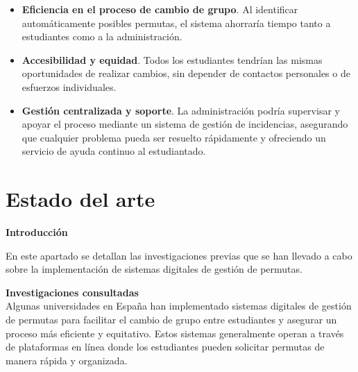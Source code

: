 \begin{itemize}

\item  \textbf{Eficiencia en el proceso de cambio de grupo}. Al identificar automáticamente posibles permutas, el sistema ahorraría tiempo tanto a estudiantes como a la administración.

\item  \textbf{Accesibilidad y equidad}. Todos los estudiantes tendrían las mismas oportunidades de realizar cambios, sin depender de contactos personales o de esfuerzos individuales.
    
\item \textbf{Gestión centralizada y soporte}. La administración podría supervisar y apoyar el proceso mediante un sistema de gestión de incidencias, asegurando que cualquier problema pueda ser resuelto rápidamente y ofreciendo un servicio de ayuda continuo al estudiantado.

\end{itemize}


\section{Estado del arte}

\textbf{Introducción}

En este apartado se detallan las investigaciones previas que se han llevado a cabo sobre la implementación de sistemas digitales de gestión de permutas.

\textbf{Investigaciones consultadas}\\
Algunas universidades en España han implementado sistemas digitales de gestión de permutas para facilitar el cambio de grupo entre estudiantes y asegurar un proceso más eficiente y equitativo. Estos sistemas generalmente operan a través de plataformas en línea donde los estudiantes pueden solicitar permutas de manera rápida y organizada.\\

